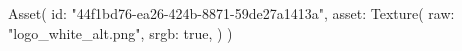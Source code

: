 Asset(
    id: "{44f1bd76-ea26-424b-8871-59de27a1413a}",
    asset: Texture(
        raw:  "logo_white_alt.png",
        srgb: true,
    )
)
